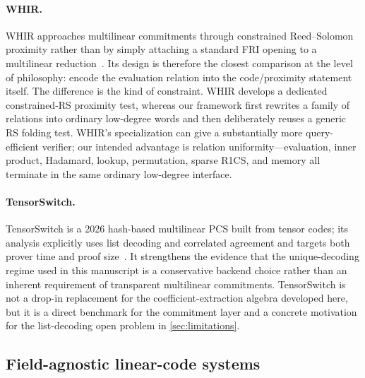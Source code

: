 \paragraph{WHIR.}
WHIR approaches multilinear commitments through constrained Reed--Solomon proximity rather than by simply attaching a standard FRI opening to a multilinear reduction~\cite{WHIR24}.  Its design is therefore the closest comparison at the level of philosophy: encode the evaluation relation into the code/proximity statement itself.  The difference is the kind of constraint.  WHIR develops a dedicated constrained-RS proximity test, whereas our framework first rewrites a family of relations into ordinary low-degree words and then deliberately reuses a generic RS folding test.  WHIR's specialization can give a substantially more query-efficient verifier; our intended advantage is relation uniformity---evaluation, inner product, Hadamard, lookup, permutation, sparse R1CS, and memory all terminate in the same ordinary low-degree interface.

\paragraph{TensorSwitch.}
TensorSwitch is a 2026 hash-based multilinear PCS built from tensor codes; its analysis explicitly uses list decoding and correlated agreement and targets both prover time and proof size~\cite{TensorSwitch26}.  It strengthens the evidence that the unique-decoding regime used in this manuscript is a conservative backend choice rather than an inherent requirement of transparent multilinear commitments.  TensorSwitch is not a drop-in replacement for the coefficient-extraction algebra developed here, but it is a direct benchmark for the commitment layer and a concrete motivation for the list-decoding open problem in \cref{sec:limitations}.

\subsection{Field-agnostic linear-code systems}
\label{sec:comparison-brakedown}

